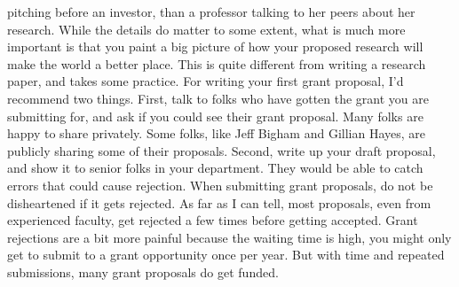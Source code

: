 \documentclass[oneside,11pt]{memoir}
\begin{document}
pitching before an investor, than a professor talking to her peers about her research. While the
details do matter to some extent, what is much more important is that you paint a big picture of
how your proposed research will make the world a better place. This is quite different from
writing a research paper, and takes some practice.
For writing your first grant proposal, I’d recommend two things. First, talk to folks who have
gotten the grant you are submitting for, and ask if you could see their grant proposal. Many folks
are happy to share privately. Some folks, like Jeff Bigham and Gillian Hayes, are publicly sharing
some of their proposals. Second, write up your draft proposal, and show it to senior folks in your
department. They would be able to catch errors that could cause rejection.
When submitting grant proposals, do not be disheartened if it gets rejected. As far as I can tell,
most proposals, even from experienced faculty, get rejected a few times before getting
accepted. Grant rejections are a bit more painful because the waiting time is high, you might
only get to submit to a grant opportunity once per year. But with time and repeated submissions,
many grant proposals do get funded.
\end{document}
